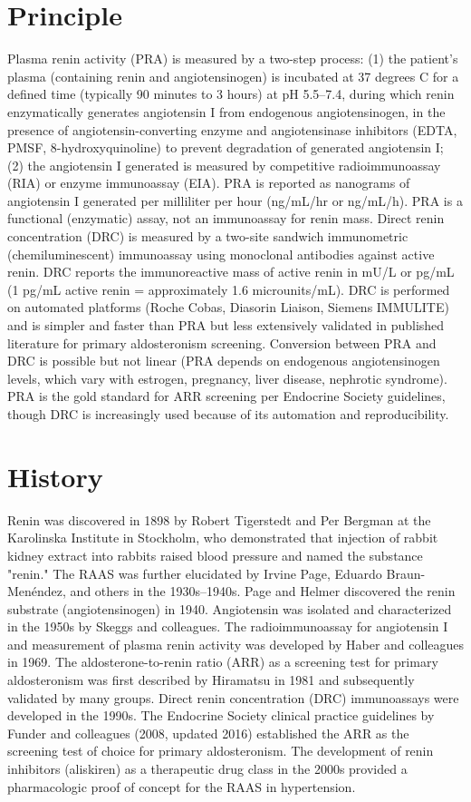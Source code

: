 \section*{Principle}
Plasma renin activity (PRA) is measured by a two-step process: (1) the patient's plasma (containing renin and angiotensinogen) is incubated at 37 degrees C for a defined time (typically 90 minutes to 3 hours) at pH 5.5--7.4, during which renin enzymatically generates angiotensin I from endogenous angiotensinogen, in the presence of angiotensin-converting enzyme and angiotensinase inhibitors (EDTA, PMSF, 8-hydroxyquinoline) to prevent degradation of generated angiotensin I; (2) the angiotensin I generated is measured by competitive radioimmunoassay (RIA) or enzyme immunoassay (EIA). PRA is reported as nanograms of angiotensin I generated per milliliter per hour (ng/mL/hr or ng/mL/h). PRA is a functional (enzymatic) assay, not an immunoassay for renin mass. Direct renin concentration (DRC) is measured by a two-site sandwich immunometric (chemiluminescent) immunoassay using monoclonal antibodies against active renin. DRC reports the immunoreactive mass of active renin in mU/L or pg/mL (1 pg/mL active renin = approximately 1.6 microunits/mL). DRC is performed on automated platforms (Roche Cobas, Diasorin Liaison, Siemens IMMULITE) and is simpler and faster than PRA but less extensively validated in published literature for primary aldosteronism screening. Conversion between PRA and DRC is possible but not linear (PRA depends on endogenous angiotensinogen levels, which vary with estrogen, pregnancy, liver disease, nephrotic syndrome). PRA is the gold standard for ARR screening per Endocrine Society guidelines, though DRC is increasingly used because of its automation and reproducibility.

\section*{History}
Renin was discovered in 1898 by Robert Tigerstedt and Per Bergman at the Karolinska Institute in Stockholm, who demonstrated that injection of rabbit kidney extract into rabbits raised blood pressure and named the substance "renin." The RAAS was further elucidated by Irvine Page, Eduardo Braun-Menéndez, and others in the 1930s--1940s. Page and Helmer discovered the renin substrate (angiotensinogen) in 1940. Angiotensin was isolated and characterized in the 1950s by Skeggs and colleagues. The radioimmunoassay for angiotensin I and measurement of plasma renin activity was developed by Haber and colleagues in 1969. The aldosterone-to-renin ratio (ARR) as a screening test for primary aldosteronism was first described by Hiramatsu in 1981 and subsequently validated by many groups. Direct renin concentration (DRC) immunoassays were developed in the 1990s. The Endocrine Society clinical practice guidelines by Funder and colleagues (2008, updated 2016) established the ARR as the screening test of choice for primary aldosteronism. The development of renin inhibitors (aliskiren) as a therapeutic drug class in the 2000s provided a pharmacologic proof of concept for the RAAS in hypertension.

